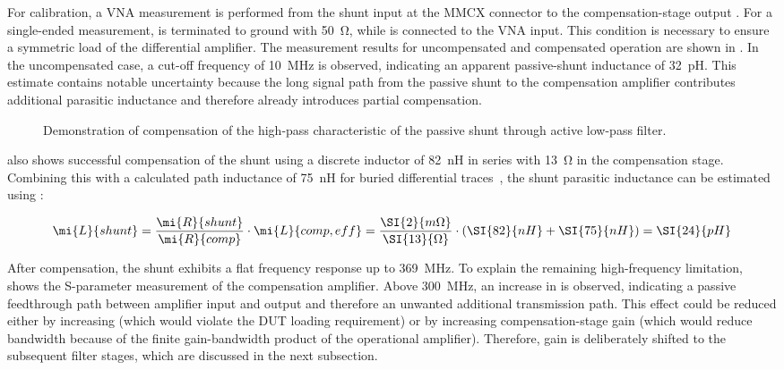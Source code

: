 For calibration, a VNA measurement is performed from the shunt input  at the MMCX connector to the compensation-stage output .
For a single-ended measurement,  is terminated to ground with \SI{50}{\ohm}, while  is connected to the VNA input.
This condition is necessary to ensure a symmetric load of the differential amplifier.
The measurement results for uncompensated and compensated operation are shown in .
In the uncompensated case, a cut-off frequency of \SI{10}{MHz} is observed, indicating an apparent passive-shunt inductance of \SI{32}{pH}.
This estimate contains notable uncertainty because the long signal path from the passive shunt to the compensation amplifier contributes additional parasitic inductance and therefore already introduces partial compensation.

\begin{figure}[ht]
	\centering
	
	\caption{Demonstration of compensation of the high-pass characteristic of the passive shunt through active low-pass filter.}\label{fig:VNA_AShunt_comp}
\end{figure}

 also shows successful compensation of the shunt using a discrete inductor of \SI{82}{nH} in series with \SI{13}{\ohm} in the compensation stage.
Combining this with a calculated path inductance of \SI{75}{nH} for buried differential traces~\cite{vielspassspaeter}, the shunt parasitic inductance can be estimated using :

\begin{equation}
	\mi{L}{shunt} = \frac{\mi{R}{shunt}}{\mi{R}{comp}}\cdot \mi{L}{comp,eff} = \frac{\SI{2}{m\Omega}}{\SI{13}{\Omega}}\cdot (\SI{82}{nH}+\SI{75}{nH}) = \SI{24}{pH}
\end{equation}

After compensation, the shunt exhibits a flat frequency response up to \SI{369}{MHz}.
To explain the remaining high-frequency limitation,  shows the S-parameter measurement of the compensation amplifier.
Above \SI{300}{MHz}, an increase in  is observed, indicating a passive feedthrough path between amplifier input and output and therefore an unwanted additional transmission path.
This effect could be reduced either by increasing  (which would violate the DUT loading requirement) or by increasing compensation-stage gain (which would reduce bandwidth because of the finite gain-bandwidth product of the operational amplifier).
Therefore, gain is deliberately shifted to the subsequent filter stages, which are discussed in the next subsection.

